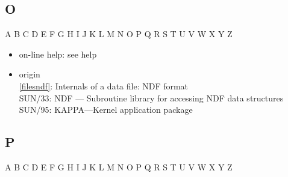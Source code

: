 \documentclass[11pt,twoside]{article}
\newcommand{\htmlref}[2]{#1}
\newcommand{\xref}[3]{#1}
\newcommand{\idxint}[2]{\ref{#1}: \htmlref{#2}{#1}}
\newcommand{\idxint}[2]{\htmlref{#2}{#1}}
\newcommand{\latorhtm}[2]{#1}
\newcommand{\latorhtm}[2]{#2}
\begin{document}
\subsection*{\label{index_O}O}

\begin{htmlonly}
\htmlref{A}{index_A}
\htmlref{B}{index_B}
\htmlref{C}{index_C}
\htmlref{D}{index_D}
\htmlref{E}{index_E}
\htmlref{F}{index_F}
\htmlref{G}{index_G}
\htmlref{H}{index_H}
\htmlref{I}{index_I}
\htmlref{J}{index_J}
\htmlref{K}{index_K}
\htmlref{L}{index_L}
\htmlref{M}{index_M}
\htmlref{N}{index_N}
O
\htmlref{P}{index_P}
\htmlref{Q}{index_Q}
\htmlref{R}{index_R}
\htmlref{S}{index_S}
\htmlref{T}{index_T}
\htmlref{U}{index_U}
\htmlref{V}{index_V}
\htmlref{W}{index_W}
\htmlref{X}{index_X}
\htmlref{Y}{index_Y}
Z
\end{htmlonly}

\begin{itemize}
\item on-line help: see help
\item origin\\
   \idxint{filesndf}{Internals of a data file: NDF format}\\
   \xref{SUN/33: NDF \latorhtm{---}{-} Subroutine library for accessing NDF data
      structures}{sun33}{}\\
   \xref{SUN/95: KAPPA\latorhtm{---}{-}Kernel application pack\-age}{sun95}{SETORIGIN}
\end{itemize}

\subsection*{\label{index_P}P}

\begin{htmlonly}
\htmlref{A}{index_A}
\htmlref{B}{index_B}
\htmlref{C}{index_C}
\htmlref{D}{index_D}
\htmlref{E}{index_E}
\htmlref{F}{index_F}
\htmlref{G}{index_G}
\htmlref{H}{index_H}
\htmlref{I}{index_I}
\htmlref{J}{index_J}
\htmlref{K}{index_K}
\htmlref{L}{index_L}
\htmlref{M}{index_M}
\htmlref{N}{index_N}
\htmlref{O}{index_O}
P
\htmlref{Q}{index_Q}
\htmlref{R}{index_R}
\htmlref{S}{index_S}
\htmlref{T}{index_T}
\htmlref{U}{index_U}
\htmlref{V}{index_V}
\htmlref{W}{index_W}
\htmlref{X}{index_X}
\htmlref{Y}{index_Y}
Z
\end{htmlonly}
\end{document}
